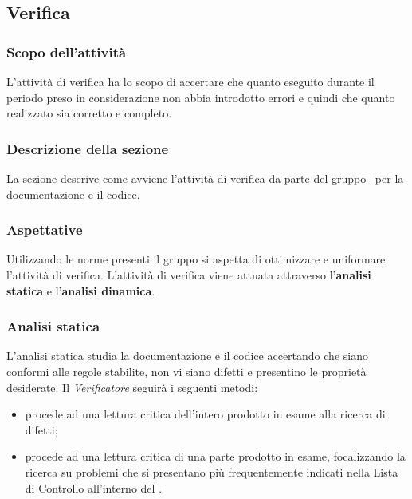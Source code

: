 \subsection{Verifica}\label{Verifica}
\subsubsection{Scopo dell'attività} \label{PSup_Verifica_Scopo}
L'attività di verifica ha lo scopo di accertare che quanto eseguito durante il periodo preso in considerazione non abbia introdotto errori e quindi che quanto realizzato sia corretto e completo.

\subsubsection{Descrizione della sezione} 
La sezione descrive come avviene l'attività di verifica da parte del gruppo \Gruppo\ per la documentazione e il codice.

\subsubsection{Aspettative}
Utilizzando le norme presenti il gruppo si aspetta di ottimizzare e uniformare l'attività di verifica. L'attività di verifica viene attuata attraverso l'\textbf{analisi statica} e l'\textbf{analisi dinamica}.

\subsubsection{Analisi statica}
L'analisi statica studia la documentazione e il codice accertando che siano conformi alle regole stabilite, non vi siano difetti e presentino le proprietà desiderate.
Il \textit{Verificatore} seguirà i seguenti metodi:
\begin{itemize}
	\item {} procede ad una lettura critica dell'intero prodotto in esame alla ricerca di difetti;
	\item {} procede ad una lettura critica di una parte prodotto in esame, focalizzando la ricerca su problemi che si presentano più frequentemente indicati nella Lista di Controllo all'interno del \textit{\PdQ}.
\end{itemize}

